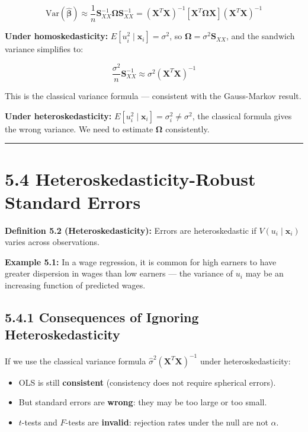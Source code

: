 \[
\text{Var}(\hat{\boldsymbol{\beta}}) \approx \frac{1}{n} \mathbf{S}_{XX}^{-1} \boldsymbol{\Omega} \mathbf{S}_{XX}^{-1} = (\mathbf{X}^T\mathbf{X})^{-1}\left[\mathbf{X}^T\boldsymbol{\Omega}\mathbf{X}\right](\mathbf{X}^T\mathbf{X})^{-1}
\]

\textbf{Under homoskedasticity:} $E[u_i^2 \mid \mathbf{x}_i] = \sigma^2$, so $\boldsymbol{\Omega} = \sigma^2 \mathbf{S}_{XX}$, and the sandwich variance simplifies to:

\[
\frac{\sigma^2}{n} \mathbf{S}_{XX}^{-1} \approx \sigma^2 (\mathbf{X}^T\mathbf{X})^{-1}
\]

This is the classical variance formula --- consistent with the Gauss-Markov result.

\textbf{Under heteroskedasticity:} $E[u_i^2 \mid \mathbf{x}_i] = \sigma_i^2 \neq \sigma^2$, the classical formula gives the wrong variance. We need to estimate $\boldsymbol{\Omega}$ consistently.

\medskip\hrule\medskip

\section{5.4 Heteroskedasticity-Robust Standard Errors}

\textbf{Definition 5.2 (Heteroskedasticity):} Errors are heteroskedastic if $V(u_i \mid \mathbf{x}_i)$ varies across observations.

\textbf{Example 5.1:} In a wage regression, it is common for high earners to have greater dispersion in wages than low earners --- the variance of $u_i$ may be an increasing function of predicted wages.

\subsection{5.4.1 Consequences of Ignoring Heteroskedasticity}

If we use the classical variance formula $\hat{\sigma}^2(\mathbf{X}^T\mathbf{X})^{-1}$ under heteroskedasticity:
\begin{itemize}
\item OLS is still \textbf{consistent} (consistency does not require spherical errors).
\item But standard errors are \textbf{wrong}: they may be too large or too small.
\item $t$-tests and $F$-tests are \textbf{invalid}: rejection rates under the null are not $\alpha$.
\end{itemize}

